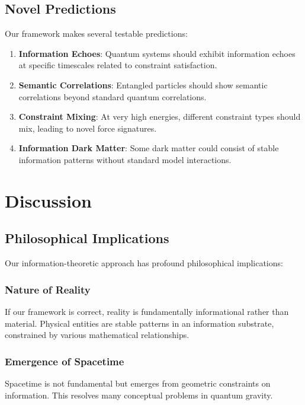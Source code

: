 \documentclass[11pt,a4paper]{article}
\begin{document}
\subsection{Novel Predictions}

Our framework makes several testable predictions:

\begin{enumerate}
\item \textbf{Information Echoes}: Quantum systems should exhibit information echoes at specific timescales related to constraint satisfaction.

\item \textbf{Semantic Correlations}: Entangled particles should show semantic correlations beyond standard quantum correlations.

\item \textbf{Constraint Mixing}: At very high energies, different constraint types should mix, leading to novel force signatures.

\item \textbf{Information Dark Matter}: Some dark matter could consist of stable information patterns without standard model interactions.
\end{enumerate}

\section{Discussion}

\subsection{Philosophical Implications}

Our information-theoretic approach has profound philosophical implications:

\subsubsection{Nature of Reality}
If our framework is correct, reality is fundamentally informational rather than material. Physical entities are stable patterns in an information substrate, constrained by various mathematical relationships.

\subsubsection{Emergence of Spacetime}
Spacetime is not fundamental but emerges from geometric constraints on information. This resolves many conceptual problems in quantum gravity.
\end{document}
